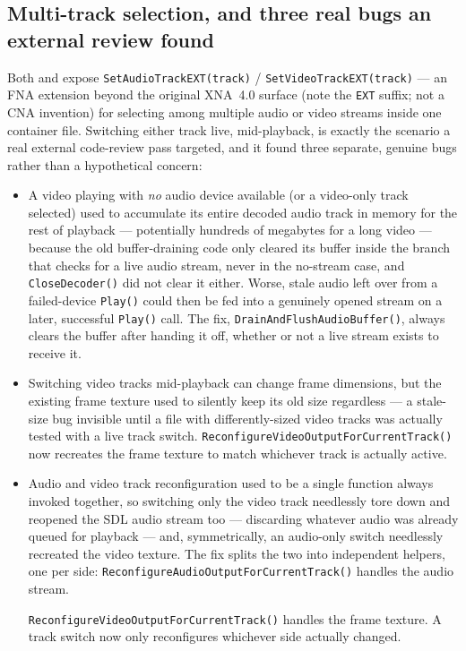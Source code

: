 \subsection{Multi-track selection, and three real bugs an external review found}

Both  and  expose \texttt{SetAudioTrackEXT(track)} /
\texttt{SetVideoTrackEXT(track)} --- an FNA extension beyond the original XNA~4.0 surface (note
the \texttt{EXT} suffix; not a CNA invention) for selecting among multiple audio or video
streams inside one container file. Switching either track live, mid-playback, is exactly the
scenario a real external code-review pass targeted, and it found three separate, genuine bugs
rather than a hypothetical concern:

\begin{itemize}
  \item A video playing with \emph{no} audio device available (or a video-only track selected)
  used to accumulate its entire decoded audio track in memory for the rest of playback ---
  potentially hundreds of megabytes for a long video --- because the old buffer-draining code
  only cleared its buffer inside the branch that checks for a live audio stream, never in the
  no-stream case, and \texttt{CloseDecoder()} did not clear it either. Worse, stale audio left
  over from a failed-device \texttt{Play()} could then be fed into a genuinely opened stream on
  a later, successful \texttt{Play()} call. The fix, \texttt{DrainAndFlushAudioBuffer()}, always
  clears the buffer after handing it off, whether or not a live stream exists to receive it.
  \item Switching video tracks mid-playback can change frame dimensions, but the existing frame
  texture used to silently keep its old size regardless --- a stale-size bug invisible until a
  file with differently-sized video tracks was actually tested with a live track switch.
  \texttt{ReconfigureVideoOutputForCurrentTrack()} now recreates the frame texture to match
  whichever track is actually active.
  \item Audio and video track reconfiguration used to be a single function always invoked
  together, so switching only the video track needlessly tore down and reopened the SDL audio
  stream too --- discarding whatever audio was already queued for playback --- and, symmetrically,
  an audio-only switch needlessly recreated the video texture. The fix splits the two into
  independent helpers, one per side: \texttt{ReconfigureAudioOutputForCurrentTrack()} handles
  the audio stream.

  \texttt{ReconfigureVideoOutputForCurrentTrack()} handles the frame texture. A track switch
  now only reconfigures whichever side actually changed.
\end{itemize}

